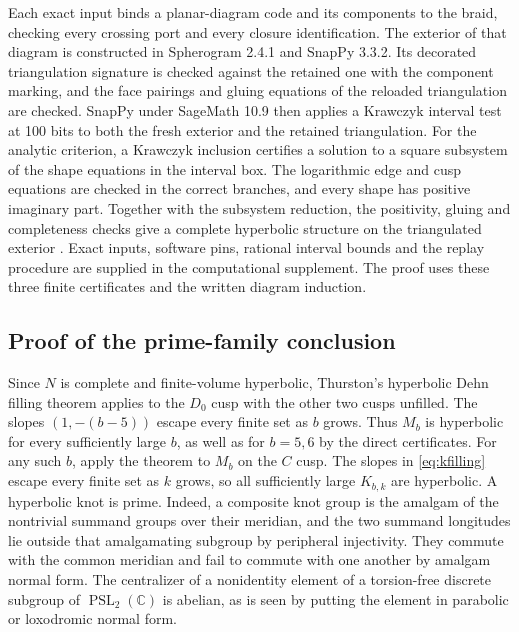 Each exact input binds a planar-diagram code and its components
to the braid, checking every crossing port and every closure
identification. The exterior of that diagram is constructed in
Spherogram 2.4.1 and SnapPy 3.3.2. Its decorated triangulation
signature is checked against the retained one with the component
marking, and the face pairings and gluing equations of the
reloaded triangulation are checked. SnapPy under SageMath 10.9
then applies a Krawczyk interval test at 100 bits to both the
fresh exterior and the retained triangulation. For the analytic
criterion, a Krawczyk inclusion certifies a solution to a
square subsystem of the shape equations in the interval box.
The logarithmic edge and cusp equations are checked in the
correct branches, and every shape has positive imaginary part.
Together with the subsystem reduction, the positivity, gluing and
completeness checks give a complete
hyperbolic structure on the triangulated exterior
\cite[Sections 2--4]{HIKMOT}. Exact inputs, software pins,
rational interval bounds and the replay procedure are supplied
in the computational supplement. The proof uses these three
finite certificates and the written diagram induction.

\subsection{Proof of the prime-family conclusion}

Since \(N\) is complete and finite-volume hyperbolic, Thurston's
hyperbolic Dehn filling theorem
\cite[Theorem 5.8.2]{Thurston} applies to the \(D_0\) cusp with
the other two cusps unfilled. The slopes \((1,-(b-5))\) escape
every finite set as \(b\) grows. Thus \(M_b\) is hyperbolic for
every sufficiently large \(b\), as well as for \(b=5,6\) by
the direct certificates. For any such \(b\), apply the theorem
to \(M_b\) on the \(C\) cusp. The slopes in \eqref{eq:kfilling}
escape every finite set as \(k\) grows, so all sufficiently
large \(K_{b,k}\) are hyperbolic. A hyperbolic knot is prime.
Indeed, a composite knot group is the amalgam of the nontrivial
summand groups over their meridian, and the two summand longitudes
lie outside that amalgamating subgroup by peripheral injectivity.
They commute with the common meridian and fail to commute with
one another by amalgam normal form. The centralizer of a nonidentity
element of a torsion-free discrete subgroup of
\(\operatorname{PSL}_2(\mathbb C)\) is abelian, as is seen by
putting the element in parabolic or loxodromic normal form.

